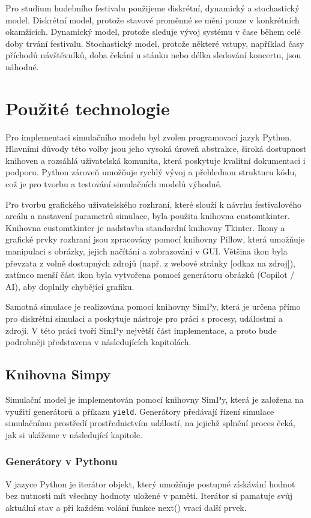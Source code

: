 \documentclass[
  program=itp,
  biblatex,
  figures=false,
  glossaries,
  index
]{kidiplom}
\begin{document}
Pro studium hudebního festivalu použijeme diskrétní, dynamický a stochastický model. Diskrétní model, protože stavové proměnné se mění pouze v konkrétních okamžicích. Dynamický model, protože sleduje vývoj systému v čase během celé doby trvání festivalu. Stochastický model, protože některé vstupy, například časy příchodů návštěvníků, doba čekání u stánku nebo délka sledování koncertu, jsou náhodné.

\section{Použité technologie}
Pro implementaci simulačního modelu byl zvolen programovací jazyk Python. Hlavními důvody této volby jsou jeho vysoká úroveň abstrakce, široká dostupnost knihoven a rozsáhlá uživatelská komunita, která poskytuje kvalitní dokumentaci i podporu. Python zároveň umožňuje rychlý vývoj a přehlednou strukturu kódu, což je pro tvorbu a testování simulačních modelů výhodné.

Pro tvorbu grafického uživatelského rozhraní, které slouží k návrhu festivalového areálu a nastavení parametrů simulace, byla použita knihovna customtkinter. Knihovna customtkinter je nadstavba standardní knihovny Tkinter. Ikony a grafické prvky rozhraní jsou zpracovány pomocí knihovny Pillow, která umožňuje manipulaci s obrázky, jejich načítání a zobrazování v GUI. Většina ikon byla převzata z volně dostupných zdrojů (např. z webové stránky [odkaz na zdroj]), zatímco menší část ikon byla vytvořena pomocí generátoru obrázků (Copilot / AI), aby doplnily chybějící grafiku.

Samotná simulace je realizována pomocí knihovny SimPy, která je určena přímo pro diskrétní simulaci a poskytuje nástroje pro práci s procesy, událostmi a zdroji. V této práci tvoří SimPy největší část implementace, a proto bude podrobněji představena v následujících kapitolách.

\subsection{Knihovna Simpy}
Simulační model je implementován pomocí knihovny SimPy, která je založena na využití generátorů a příkazu \texttt{yield}. 
Generátory předávají řízení simulace simulačnímu prostředí prostřednictvím událostí, 
na jejichž splnění proces čeká, jak si ukážeme v následující kapitole.

\subsubsection{Generátory v Pythonu}
V jazyce Python je iterátor objekt, který umožňuje postupné získávání hodnot bez nutnosti mít všechny hodnoty uložené v paměti. Iterátor si pamatuje svůj aktuální stav a při každém volání funkce next() vrací další prvek.
\end{document}
